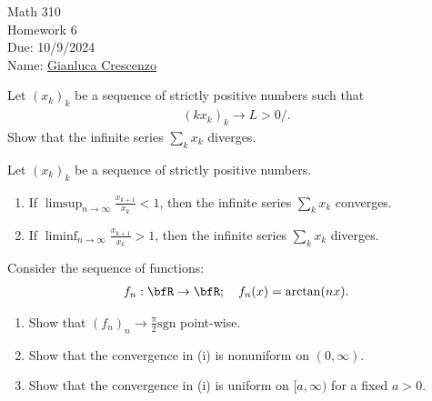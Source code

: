 \documentclass[10pt,twoside,openany]{memoir}
\begin{document}
\begin{center}
    { \Large Math 310 \\[0.1in]Homework 6 \\[0.1in]
    Due: 10/9/2024}\\[.25in]
    { Name:} {\underline{Gianluca Crescenzo\hspace*{2in}}}\\[0.15in]
    \end{center}
    \vspace{4pt}
    \begin{exercise}
        Let $(x_k)_k$ be a sequence of strictly positive numbers such that  
            \begin{equation*}
            \begin{split}
                (kx_k)_k \rightarrow L > 0/.
            \end{split}
            \end{equation*}
        Show that the infinite series $\sum_{k}x_k$ diverges.
    \end{exercise}
    \begin{exercise}
        Let $(x_k)_k$ be a sequence of strictly positive numbers.
            \begin{enumerate}[label = (\roman*)]
                \item If $\limsup_{n \rightarrow \infty}\frac{x_{k+1}}{x_k} < 1$, then the infinite series $\sum_k x_k$ converges.
                \item If $\liminf_{n \rightarrow \infty} \frac{x_{k+1}}{x_k} > 1$, then the infinite series $\sum_k x_k$ diverges.
            \end{enumerate}
    \end{exercise}
    \begin{exercise}
        Consider the sequence of functions:
            \begin{equation*}
            \begin{split}
                f_n: \bfR \rightarrow \bfR; \hspace{10pt} f_n(x) = \arctan(nx).
            \end{split}
            \end{equation*}
            \begin{enumerate}[label = (\roman*)]
                \item Show that $(f_n)_n \rightarrow \frac{\pi}{2}\text{sgn}$ point-wise.
                \item Show that the convergence in (i) is nonuniform on $(0,\infty)$.
                \item Show that the convergence in (i) is uniform on $[a,\infty)$ for a fixed $a > 0$.
            \end{enumerate}
    \end{exercise} 
\end{document}
